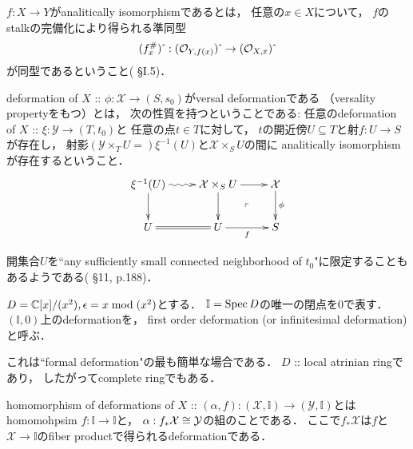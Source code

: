 \documentclass[a4paper]{jsarticle}
\newcommand{\dualnum}{\mathbb{I}}
\newcommand{\famX}{\mathcal{X}}
\newcommand{\famY}{\mathcal{Y}}
\begin{document}
    \begin{Def}
        $f: X \to Y$がanalitically isomorphismであるとは，
        任意の$x \in X$について，
        $f$のstalkの完備化により得られる準同型
        \[ (f^{\#}_x)\,\hat{}\,: (\mathcal{O}_{Y, f(x)})\,\hat{}\, \to (\mathcal{O}_{X, x})\,\hat{}\, \]
        が同型であるということ(\cite{HarAG} \S I.5)．

        deformation of $X$ :: $\phi: \famX \to (S, s_0)$がversal deformationである
        （versality propertyをもつ）とは，
        次の性質を持つということである:
        任意のdeformation of $X$ :: $\xi: \famY \to (T, t_0)$と
        任意の点$t \in T$に対して，
        $t$の開近傍$U \subseteq T$と射$f: U \to S$が存在し，
        射影$(\famY \times_T U=)\xi^{-1}(U)$と$\famX \times_S U$の間に
        analitically isomorphismが存在するということ．
        \[\vcenter{\xymatrix{
            \xi^{-1}(U) \ar[d]\ar@{~>}[r]& \famX \times_S U \ar[r]\ar[d]& \famX \ar[d]^-{\phi}\\
            U \ar@{=}[r]& U \ar[r]_-{f}& S
            \ar@{}[lu]|{\ulcorner}
        }}\]
    \end{Def}

    \begin{Remark}
        開集合$U$を``any sufficiently small connected neighborhood of $t_0$"に限定することも
        あるようである(\cite{GACII} \S11, p.188)．
    \end{Remark}

    \begin{Def}
        $D=\mathbb{C}[x]/(x^2), \epsilon=x \bmod (x^2)$とする．
        $\dualnum=\Spec D$の唯一の閉点を$0$で表す．
        $(\dualnum, 0)$上のdeformationを，
        first order deformation (or infinitesimal deformation)と呼ぶ．
    \end{Def}
    これは``formal deformation"の最も簡単な場合である．
    $D$ :: local atrinian ringであり，
    したがってcomplete ringでもある．

    \begin{Def}
        homomorphism of deformations of $X$ ::
        $(\alpha, f): (\famX, \dualnum) \to (\famY, \dualnum)$とは
        homomohpsim $f: \dualnum \to \dualnum$と，
        $\alpha: f_*\famX \iso \famY$の組のことである．
        ここで$f_* \famX$は$f$と$\famX \to \dualnum$のfiber productで得られるdeformationである．
    \end{Def}
\end{document}
